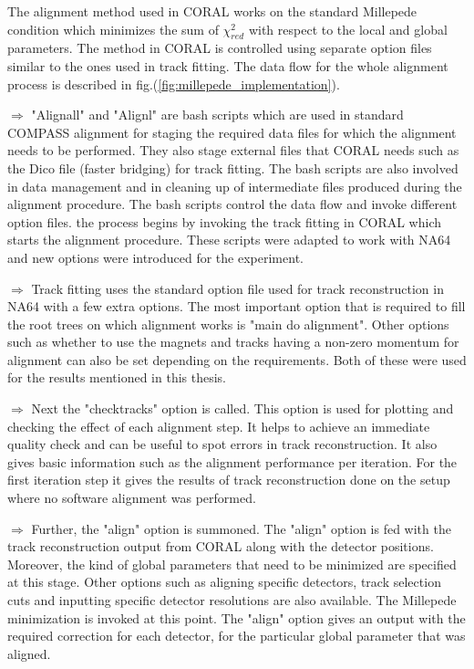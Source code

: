 The alignment method used in CORAL works on the standard Millepede condition which minimizes the sum of $\chi^2_{red}$ with respect to the local and global parameters. The method in CORAL is controlled using separate option files similar to the ones used in track fitting. The data flow for the whole alignment process is described in fig.(\ref{fig:millepede_implementation}).
\begin{description}
    \item $\Rightarrow$ "Alignall" and "Alignl" are bash scripts which are used in standard COMPASS alignment for staging the required data files for which the alignment needs to be performed. They also stage external files that CORAL needs such as the Dico file (faster bridging) for track fitting. The bash scripts are also involved in data management and in cleaning up of intermediate files produced during the alignment procedure. The bash scripts control the data flow and invoke different option files. the process begins by invoking the track fitting in CORAL which starts the alignment procedure. These scripts were adapted to work with NA64 and new options were introduced for the experiment.

    \item $\Rightarrow$ Track fitting uses the standard option file used for track reconstruction in NA64 with a few extra options. The most important option that is required to fill the root trees on which alignment works is "main do alignment". Other options such as whether to use the magnets and tracks having a non-zero momentum for alignment can also be set depending on the requirements. Both of these were used for the results mentioned in this thesis.

    \item $\Rightarrow$ Next the "checktracks" option is called. This option is used for plotting and checking the effect of each alignment step. It helps to achieve an immediate quality check and can be useful to spot errors in track reconstruction. It also gives basic information such as the alignment performance per iteration. For the first iteration step it gives the results of track reconstruction done on the setup where no software alignment was performed.

    \item $\Rightarrow$ Further, the "align" option is summoned. The "align" option is fed with the track reconstruction output from CORAL along with the detector positions. Moreover, the kind of global parameters that need to be minimized are specified at this stage. Other options such as aligning specific detectors, track selection cuts and inputting specific detector resolutions are also available. The Millepede minimization is invoked at this point. The "align" option gives an output with the required correction for each detector, for the particular global parameter that was aligned.


\end{description}
